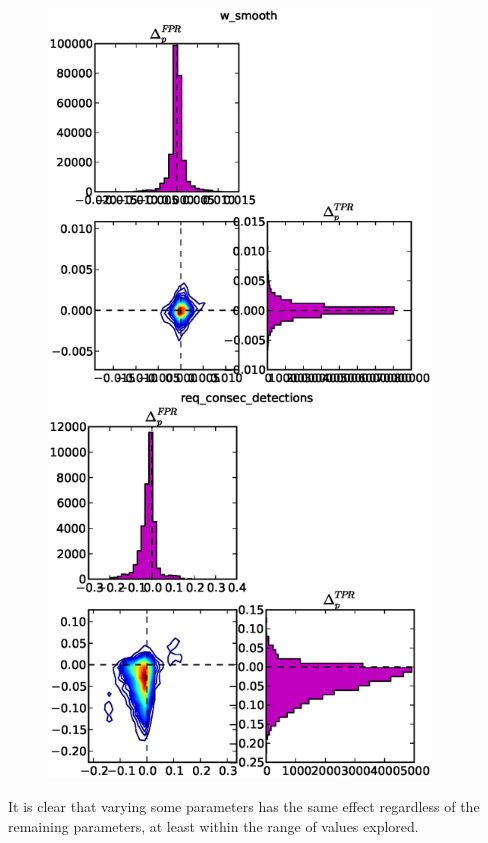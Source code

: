 \begin{figure}[!h]
\begin{center}
\includegraphics[width=4in]{../fig/final/delta_hist/w_smooth}
\includegraphics[width=4in]{../fig/final/delta_hist/req_consec_detections}
\end{center}
\caption{\label{fig:deltas3}}
\end{figure}


It is clear that varying some parameters has the same effect regardless of the
remaining parameters, at least within the range of values explored. 


